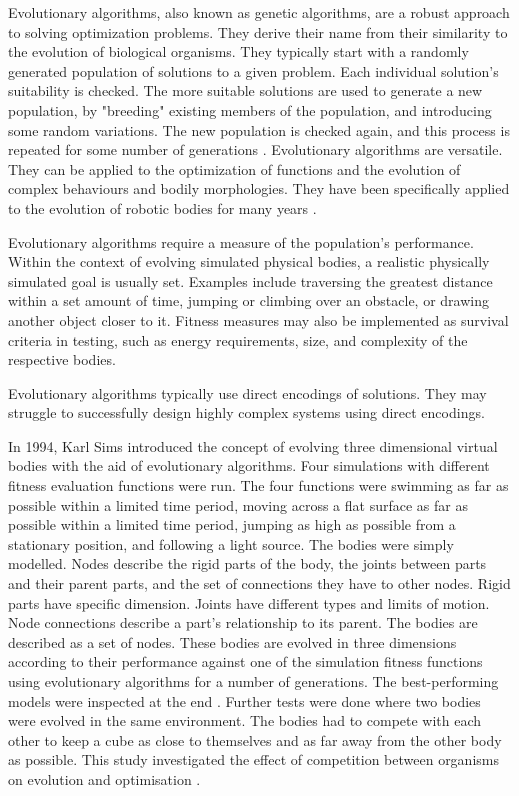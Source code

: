 Evolutionary algorithms, also known as genetic algorithms, are a robust approach to solving optimization problems. They derive their name from their similarity to the evolution of biological organisms. They typically start with a randomly generated population of solutions to a given problem. Each individual solution's suitability is checked. The more suitable solutions are used to generate a new population, by "breeding" existing members of the population, and introducing some random variations. The new population is checked again, and this process is repeated for some number of generations \citep{Groenwold1999}. Evolutionary algorithms are versatile. They can be applied to the optimization of functions and the evolution of complex behaviours and bodily morphologies. They have been specifically applied to the evolution of robotic bodies for many years \citep{Sims1994a,Sims1994b}.

Evolutionary algorithms require a measure of the population's performance. Within the context of evolving simulated physical bodies, a realistic physically simulated goal is usually set. Examples include traversing the greatest distance within a set amount of time, jumping or climbing over an obstacle, or drawing another object closer to it. Fitness measures may also be implemented as survival criteria in testing, such as energy requirements, size, and complexity of the respective bodies. \citep{Sims1994a, Sims1994b}

Evolutionary algorithms typically use direct encodings of solutions. They may struggle to successfully design highly complex systems using direct encodings. \citep{Hornby2001b}

In 1994, Karl Sims introduced the concept of evolving three dimensional virtual bodies with the aid of evolutionary algorithms. Four simulations with different fitness evaluation functions were run. The four functions were swimming as far as possible within a limited time period, moving across a flat surface as far as possible within a limited time period, jumping as high as possible from a stationary position, and following a light source. The bodies were simply modelled. Nodes describe the rigid parts of the body, the joints between parts and their parent parts, and the set of connections they have to other nodes. Rigid parts have specific dimension. Joints have different types and limits of motion. Node connections describe a part's relationship to its parent. The bodies are described as a set of nodes. These bodies are evolved in three dimensions according to their performance against one of the simulation fitness functions using evolutionary algorithms for a number of generations. The best-performing models were inspected at the end \citep{Sims1994a}. Further tests were done where two bodies were evolved in the same environment. The bodies had to compete with each other to keep a cube as close to themselves and as far away from the other body as possible. This study investigated the effect of competition between organisms on evolution and optimisation \citep{Sims1994b}.

